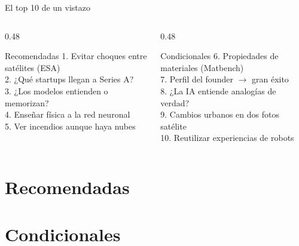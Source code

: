 \documentclass[aspectratio=169,10pt]{beamer}
\begin{document}
\begin{frame}{El top 10 de un vistazo}
  \begin{columns}[T]
    \begin{column}{0.48\textwidth}
      \begin{block}{Recomendadas}
        \scriptsize
        1. Evitar choques entre satélites (ESA)\\
        2. ¿Qué startups llegan a Series A?\\
        3. ¿Los modelos entienden o memorizan?\\
        4. Enseñar física a la red neuronal\\
        5. Ver incendios aunque haya nubes
      \end{block}
    \end{column}
    \begin{column}{0.48\textwidth}
      \begin{block}{Condicionales}
        \scriptsize
        6. Propiedades de materiales (Matbench)\\
        7. Perfil del founder $\rightarrow$ gran éxito\\
        8. ¿La IA entiende analogías de verdad?\\
        9. Cambios urbanos en dos fotos satélite\\
        10. Reutilizar experiencias de robots
      \end{block}
    \end{column}
  \end{columns}
\end{frame}

\section{Recomendadas}






\section{Condicionales}





\end{document}
